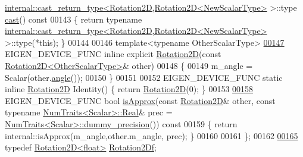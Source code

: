 \begin{DoxyCode}
      \hyperlink{struct_eigen_1_1internal_1_1cast__return__type}{internal::cast\_return\_type<Rotation2D,Rotation2D<NewScalarType>}
       >::type \hyperlink{group___geometry___module_a7a2057f37733b0d153f542fffe8207cf}{cast}()\textcolor{keyword}{ const}
00143 \textcolor{keyword}{  }\{ \textcolor{keywordflow}{return} \textcolor{keyword}{typename} 
      \hyperlink{struct_eigen_1_1internal_1_1cast__return__type}{internal::cast\_return\_type<Rotation2D,Rotation2D<NewScalarType>}
       >::type(*\textcolor{keyword}{this}); \}
00144 
00146   \textcolor{keyword}{template}<\textcolor{keyword}{typename} OtherScalarType>
\hyperlink{group___geometry___module_a28141c131bb66516477e07752278c139}{00147}   EIGEN\_DEVICE\_FUNC \textcolor{keyword}{inline} \textcolor{keyword}{explicit} \hyperlink{group___geometry___module_a28141c131bb66516477e07752278c139}{Rotation2D}(\textcolor{keyword}{const} 
      \hyperlink{group___geometry___module_class_eigen_1_1_rotation2_d}{Rotation2D<OtherScalarType>}& other)
00148   \{
00149     m\_angle = Scalar(other.\hyperlink{group___geometry___module_af34ab8da6bfe010ca66c8acafa239a6e}{angle}());
00150   \}
00151 
00152   EIGEN\_DEVICE\_FUNC \textcolor{keyword}{static} \textcolor{keyword}{inline} \hyperlink{group___geometry___module_class_eigen_1_1_rotation2_d}{Rotation2D} Identity() \{ \textcolor{keywordflow}{return} 
      \hyperlink{group___geometry___module_class_eigen_1_1_rotation2_d}{Rotation2D}(0); \}
00153 
\hyperlink{group___geometry___module_ac70ab985fd67d3cc43ea75c33c01ae3a}{00158}   EIGEN\_DEVICE\_FUNC \textcolor{keywordtype}{bool} \hyperlink{group___geometry___module_ac70ab985fd67d3cc43ea75c33c01ae3a}{isApprox}(\textcolor{keyword}{const} \hyperlink{group___geometry___module_class_eigen_1_1_rotation2_d}{Rotation2D}& other, \textcolor{keyword}{const} \textcolor{keyword}{typename} 
      \hyperlink{group___core___module_struct_eigen_1_1_num_traits}{NumTraits<Scalar>::Real}& prec = 
      \hyperlink{group___core___module_struct_eigen_1_1_num_traits}{NumTraits<Scalar>::dummy\_precision}())\textcolor{keyword}{ const}
00159 \textcolor{keyword}{  }\{ \textcolor{keywordflow}{return} internal::isApprox(m\_angle,other.m\_angle, prec); \}
00160   
00161 \};
00162 
\hyperlink{group___geometry___module_gad801876e45910d99ebc3f8425e5e2a9e}{00165} \textcolor{keyword}{typedef} \hyperlink{group___geometry___module_class_eigen_1_1_rotation2_d}{Rotation2D<float>} \hyperlink{group___geometry___module_gad801876e45910d99ebc3f8425e5e2a9e}{Rotation2Df};

\end{DoxyCode}
